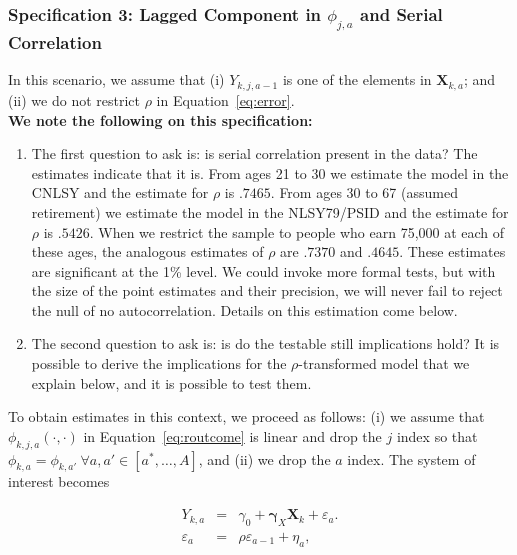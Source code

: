 \subsubsection{Specification 3: Lagged Component in $\phi_{j,a}$ and Serial Correlation} \label{section:laggedserial}

\noindent In this scenario, we assume that (i)  $Y_{k,j,a-1}$ is one of the elements in $\bm{X}_{k,a}$; and (ii) we do not restrict $\rho$ in Equation~\eqref{eq:error}.\\

\noindent \textbf{We note the following on this specification:}

\begin{enumerate}

\item The first question to ask is: is serial correlation present in the data? The estimates indicate that it is. From ages 21 to 30 we estimate the model in the CNLSY and the estimate for $\rho$ is $.7465$. From ages 30 to 67 (assumed retirement) we estimate the model in the NLSY79/PSID and the estimate for $\rho$ is $.5426$. When we restrict the sample to people who earn 75,000 at each of these ages, the analogous estimates of $\rho$ are $.7370$ and $.4645$. These estimates are significant at the 1\% level. We could invoke more formal tests, but with the size of the point estimates and their precision, we will never fail to reject the null of no autocorrelation. Details on this estimation come below.\\

\item The second question to ask is: is do the testable still implications hold?  It is possible to derive the implications for the $\rho$-transformed model that we explain below, and it is possible to test them.
\end{enumerate}

\noindent To obtain estimates in this context, we proceed as follows: (i) we assume that $\phi_{k,j,a} \left( \cdot, \cdot \right)$ in Equation~\eqref{eq:routcome} is linear and drop the $j$ index so that $\phi_{k,a} = \phi_{k,a'} \ \forall a,a' \in [a^*, \ldots, A]$, and (ii) we drop the $a$ index. The system of interest becomes

\begin{eqnarray}
Y_{k,a} &=&\gamma_{0} + \bm{\gamma}_{X} \bm{X}_{k} + \varepsilon_{a}. \label{eq:linear1} \\
\varepsilon_{a} &=& \rho \varepsilon_{a-1} + \eta_{a}, \label{eq:linear2}
\end{eqnarray}

